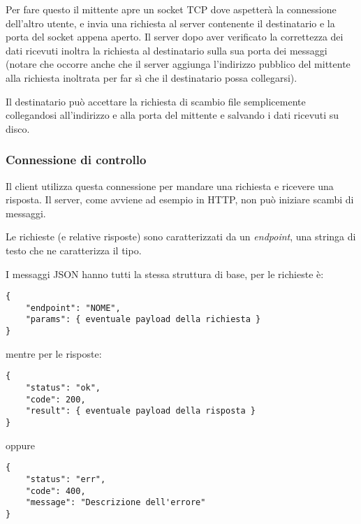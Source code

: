 Per fare questo il mittente apre un socket TCP dove aspetterà la connessione dell'altro utente, e invia una richiesta al server contenente il destinatario e la porta del socket appena aperto. Il server dopo aver verificato la correttezza dei dati ricevuti inoltra la richiesta al destinatario sulla sua porta dei messaggi (notare che occorre anche che il server aggiunga l'indirizzo pubblico del mittente alla richiesta inoltrata per far sì che il destinatario possa collegarsi).

Il destinatario può accettare la richiesta di scambio file semplicemente collegandosi all'indirizzo e alla porta del mittente e salvando i dati ricevuti su disco.

\subsubsection{Connessione di controllo}
Il client utilizza questa connessione per mandare una richiesta e ricevere una risposta. Il server, come avviene ad esempio in HTTP, non può iniziare scambi di messaggi.

Le richieste (e relative risposte) sono caratterizzati da un \textit{endpoint}, una stringa di testo che ne caratterizza il tipo.

I messaggi JSON hanno tutti la stessa struttura di base, per le richieste è:
\begin{verbatim}
{
    "endpoint": "NOME",
    "params": { eventuale payload della richiesta }
}
\end{verbatim}

mentre per le risposte:
\begin{verbatim}
{
    "status": "ok",
    "code": 200,
    "result": { eventuale payload della risposta }
}
\end{verbatim}

oppure
\begin{verbatim}
{
    "status": "err",
    "code": 400,
    "message": "Descrizione dell'errore"
}
\end{verbatim}

\medskip
